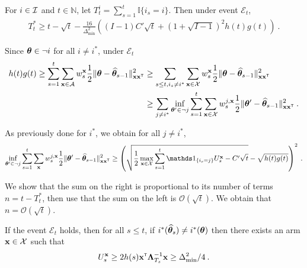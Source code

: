 \begin{theorem}
For $i\in\mathcal{I}$ and $t\in \mathbb{N}$, let $T_t^i = \sum_{s=1}^t \mathbb{I}\{i_s=i\}$. Then under event $\mathcal E_t$,
\begin{align*}
T_t^*
\ge t - \sqrt{t} - \frac{16}{\Delta_{\min}^2}\left((I-1)C'\sqrt{t} + (1 + \sqrt{I-1})^2 h(t)g(t)\right)
\: .
\end{align*}
\end{theorem}

Since ${\boldsymbol \theta} \in \neg i$ for all $i\neq i^*$, under $\mathcal E_t$%
\begin{align*}
h(t)g(t)
\ge \sum_{s=1}^t \sum_{{\bf x}\in\mathcal{A}} w_s^{\bf x} \frac{1}{2}\Vert {\boldsymbol \theta} - \widehat{{\boldsymbol \theta}}_{s-1} \Vert_{{\bf x}{\bf x}^\mathsf{\scriptscriptstyle T}}^2
&\ge \sum_{s\le t, i_s\neq i^*} \sum_{{\bf x}\in\mathcal{X}} w_s^{\bf x} \frac{1}{2}\Vert {\boldsymbol \theta} - \widehat{{\boldsymbol \theta}}_{s-1} \Vert_{{\bf x}{\bf x}^\mathsf{\scriptscriptstyle T}}^2
\\
&\ge \sum_{j \neq i^*} \inf_{{\boldsymbol \theta}'\in \neg j} \sum_{s = 1}^t \sum_{{\bf x}\in\mathcal{X}} w_s^{j,{\bf x}} \frac{1}{2}\Vert {\boldsymbol \theta}' - \widehat{{\boldsymbol \theta}}_{s-1} \Vert_{{\bf x}{\bf x}^\mathsf{\scriptscriptstyle T}}^2
\: .
\end{align*}

As previously done for $i^*$, we obtain for all $j\neq i^*$,
\begin{align*}
\inf_{\btheta'\in \neg j} \sum_{s = 1}^t \sum_{\bx} w_s^{j,\bx} \frac{1}{2}\Vert \btheta' - \hat{\btheta}_{s-1} \Vert_{\bx\bx\transpose}^2
\ge  \left(\sqrt{\frac{1}{2}\max_{\bx\in\cX} \sum_{s=1}^t \ind_{\{i_s=j\}} U_s^\bx - C'\sqrt{t}} - \sqrt{h(t)g(t)}\right)^2
\: .
\end{align*}

We show that the sum on the right is proportional to its number of terms $n = t - T_t^*$, then use that the sum on the left is $\mathcal O(\sqrt{t})$. We obtain that $n = \mathcal O(\sqrt{t})$.

\begin{lemma}
If the event $\mathcal E_t$ holds, then for all $s\le t$, if $i^*(\widehat{{\boldsymbol \theta}}_s) \neq i^*({\boldsymbol \theta})$ then there exists an arm ${\bf x}\in\mathcal{X}$ such that
\begin{align*}
U_s^{\bf x} \ge 2 h(s) {\bf x}^\mathsf{\scriptscriptstyle T} {\boldsymbol \Lambda}_{T_s}^{-1}{\bf x} \ge \Delta_{\min}^2/4 \: .
\end{align*}
\end{lemma}

